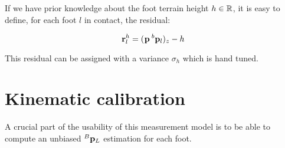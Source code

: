 If we have prior knowledge about the foot terrain height $h \in \mathbb{R}$, it is easy to define, for each foot $l$ in contact, the residual:

\begin{equation}
    {\bf r}^h_l = (\prescript{}{}{{\bf p}}_{} \prescript{b}{}{{\bf p}}_{l})_z - h
\end{equation}

This residual can be assigned with a variance $\sigma_h$ which is hand tuned.

\section{Kinematic calibration}
A crucial part of the usability of this measurement model is to be able to compute an unbiased $\prescript{B}{}{{\bf p}}_{L}$ estimation for each foot.
